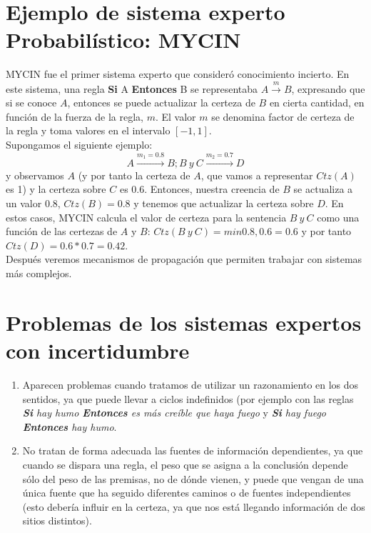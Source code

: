 \documentclass{article}
\begin{document}
\section{Ejemplo de sistema experto Probabilístico: MYCIN}
MYCIN fue el primer sistema experto que consideró conocimiento incierto. En este sistema, una regla \textbf{Si} A \textbf{Entonces} B se representaba $A \overset{m}{\rightarrow}B$, expresando que si se conoce $A$, entonces se puede actualizar la certeza de $B$ en cierta cantidad, en función de la fuerza de la regla, $m$. El valor $m$ se denomina factor de certeza de la regla y toma valores en el intervalo $[-1,1]$.\\

Supongamos el siguiente ejemplo:
\[A \overset{m_1=0.8}{\longrightarrow} B ; B\ y\ C \overset{m_2=0.7}{\longrightarrow} D
\]
y observamos $A$ (y por tanto la certeza de $A$, que vamos a representar $Ctz(A)$ es 1) y la certeza sobre $C$ es 0.6. Entonces, nuestra creencia de $B$ se actualiza a un valor 0.8, $Ctz(B)=0.8$ y tenemos que actualizar la certeza sobre $D$. En estos casos, MYCIN calcula el valor de certeza para la sentencia $B\ y \ C$ como una función de las certezas de $A$ y $B$: $Ctz(B\ y\ C) = min{0.8,0.6}=0.6$ y por tanto $Ctz(D)=0.6*0.7=0.42$.\\
Después veremos mecanismos de propagación que permiten trabajar con sistemas más complejos.

\section{Problemas de los sistemas expertos con incertidumbre}
\begin{enumerate}
    \item Aparecen problemas cuando tratamos de utilizar un razonamiento en los dos sentidos, ya que puede llevar a ciclos indefinidos (por ejemplo con las reglas \textit{\textbf{Si} hay humo \textbf{Entonces} es más creíble que haya fuego} y \textit{\textbf{Si} hay fuego \textbf{Entonces} hay humo}.
    \item No tratan de forma adecuada las fuentes de información dependientes, ya que cuando se dispara una regla, el peso que se asigna a la conclusión depende sólo del peso de las premisas, no de dónde vienen, y puede que vengan de una única fuente que ha seguido diferentes caminos o de fuentes independientes (esto debería influir en la certeza, ya que nos está llegando información de dos sitios distintos).
\end{enumerate}
\end{document}
